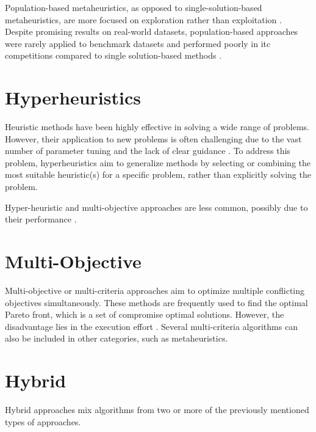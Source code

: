 Population-based metaheuristics, as opposed to single-solution-based metaheuristics, are more focused on exploration rather than exploitation \cite{talbi2009metaheuristics,du2016search}. Despite promising results on real-world datasets, population-based approaches were rarely applied to benchmark datasets and performed poorly in \ac{itc} competitions compared to single solution-based methods \cite{abdipoor_meta-heuristic_2023}.


\section{Hyperheuristics}

Heuristic methods have been highly effective in solving a wide range of problems. However, their application to new problems is often challenging due to the vast number of parameter tuning and the lack of clear guidance \cite{hyper_heuristics_survey}. To address this problem, hyperheuristics aim to generalize methods by selecting or combining the most suitable heuristic(s) for a specific problem, rather than explicitly solving the problem.

Hyper-heuristic and multi-objective approaches are less common, possibly due to their performance \cite{chen_survey_2021}.

\section{Multi-Objective}

Multi-objective or multi-criteria approaches aim to optimize multiple conflicting objectives simultaneously. These methods are frequently used to find the optimal Pareto front, which is a set of compromise optimal solutions. However, the disadvantage lies in the execution effort \cite{chen_survey_2021}. Several multi-criteria algorithms can also be included in other categories, such as metaheuristics.

\section{Hybrid}

Hybrid approaches mix algorithms from two or more of the previously mentioned types of approaches.

